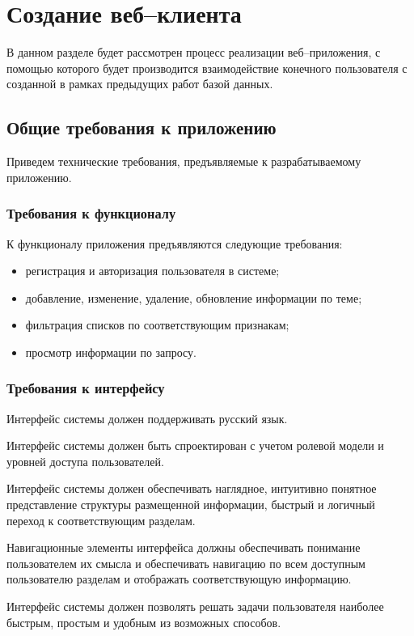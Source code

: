 \chapter{Создание веб--клиента}

В данном разделе будет рассмотрен процесс реализации веб--приложения, с помощью которого будет производится взаимодействие конечного пользователя с созданной в рамках предыдущих работ базой данных. 

\section{Общие требования к приложению}

Приведем технические требования, предъявляемые к разрабатываемому приложению.

\subsection{Требования к функционалу}
К функционалу приложения предъявляются следующие требования:
\begin{itemize}
	\item регистрация и авторизация пользователя в системе;
	\item добавление, изменение, удаление, обновление информации по
	теме;
	\item фильтрация списков по соответствующим признакам;
	\item просмотр информации по запросу.
\end{itemize}

\subsection{Требования к интерфейсу}

Интерфейс системы должен поддерживать русский язык.

Интерфейс системы должен быть спроектирован с учетом ролевой
модели и уровней доступа пользователей.

Интерфейс системы должен обеспечивать наглядное, интуитивно
понятное представление структуры размещенной информации, быстрый и
логичный переход к соответствующим разделам.

Навигационные элементы интерфейса должны обеспечивать понимание
пользователем их смысла и обеспечивать навигацию по всем доступным
пользователю разделам и отображать соответствующую информацию.

Интерфейс системы должен позволять решать задачи пользователя
наиболее быстрым, простым и удобным из возможных способов.

